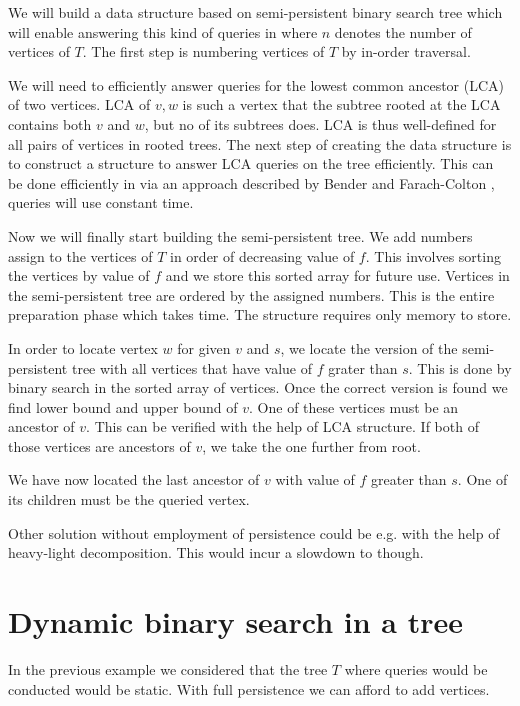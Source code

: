 We will build a data structure based on semi-persistent binary search tree which will enable answering this kind of queries in  where $n$ denotes the number of vertices of $T$. The first step is numbering vertices of $T$ by in-order traversal. 

We will need to efficiently answer queries for the lowest common ancestor (LCA) of two vertices. LCA of $v, w$ is such a vertex that the subtree rooted at the LCA contains both $v$ and $w$, but no of its subtrees does. LCA is thus well-defined for all pairs of vertices in rooted trees. The next step of creating the data structure is to construct a structure to answer LCA queries on the tree efficiently. This can be done efficiently in  via an approach described by Bender and Farach-Colton \cite{lca}, queries will use constant time.

Now we will finally start building the semi-persistent tree. We add numbers assign to the vertices of $T$ in order of decreasing value of $f$. This involves sorting the vertices by value of $f$ and we store this sorted array for future use. Vertices in the semi-persistent tree are ordered by the assigned numbers. This is the entire preparation phase which takes  time. The structure requires only  memory to store.

In order to locate vertex $w$ for given $v$ and $s$, we locate the version of the semi-persistent tree with all vertices that have value of $f$ grater than $s$. This is done by binary search in the sorted array of vertices. Once the correct version is found we find lower bound and upper bound of $v$. One of these vertices must be an ancestor of $v$. This can be verified with the help of LCA structure. If both of those vertices are ancestors of $v$, we take the one further from root. 

We have now located the last ancestor of $v$ with value of $f$ greater than $s$. One of its children must be the queried vertex.

Other solution without employment of persistence could be e.g. with the help of heavy-light decomposition. This would incur a slowdown to  though.



\section{Dynamic binary search in a tree}

In the previous example we considered that the tree $T$ where queries would be conducted would be static. With full persistence we can afford to add vertices. %

